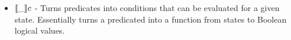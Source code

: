 \begin{itemize}
    \item $\llbracket \_ \rrbracket c$ - Turns predicates into conditions that can be evaluated for a given state. Essentially turns a predicated into a function from states to Boolean logical values.
    \begin{code}
        \>[2]\AgdaSpace{}%
        \AgdaSymbol{:}\AgdaSpace{}%
        \<%
        \\
        \>[2]\AgdaSpace{}%
        \AgdaSymbol{=}\AgdaSpace{}%
        \AgdaSpace{}%
        \AgdaSpace{}%
        \<%
        \\
        \>[2]\AgdaSpace{}%
        \AgdaSymbol{:}\AgdaSpace{}%
        \AgdaSpace{}%
        \AgdaSpace{}%
        \<%
    \end{code}
\end{itemize}

